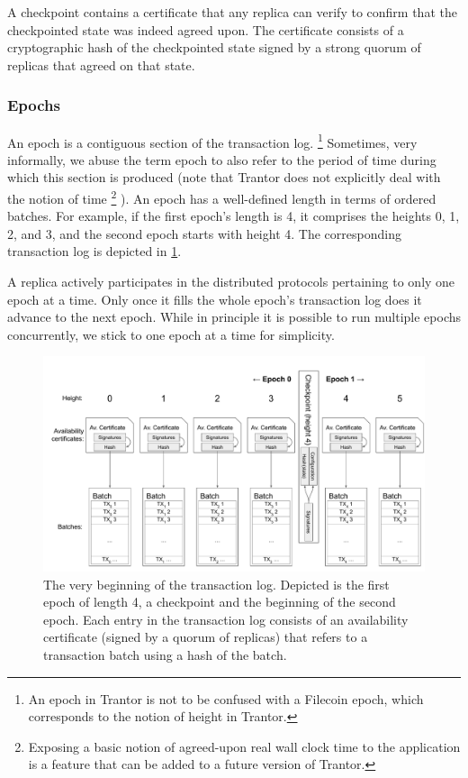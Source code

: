\documentclass{article}
\begin{document}
A checkpoint contains a certificate that any replica can verify
to confirm that the checkpointed state was indeed agreed upon.
The certificate consists of a cryptographic hash of the checkpointed state
signed by a strong quorum of replicas that agreed on that state.

\subsubsection{Epochs}

An epoch is a contiguous section of the transaction log.%
\footnote{An epoch in Trantor is not to be confused with a Filecoin epoch,
which corresponds to the notion of height in Trantor.}
Sometimes, very informally, we abuse the term epoch to also refer to the period of time
during which this section is produced (note that Trantor does not explicitly deal with the notion of time%
\footnote{Exposing a basic notion of agreed-upon real wall clock time to the application
is a feature that can be added to a future version of Trantor.}
).
An epoch has a well-defined length in terms of ordered batches.
For example, if the first epoch’s length is 4, it comprises the heights 0, 1, 2, and 3,
and the second epoch starts with height 4.
The corresponding transaction log is depicted in \cref{fig:transaction-log}.

A replica actively participates in the distributed protocols pertaining to only one epoch at a time.
Only once it fills the whole epoch’s transaction log does it advance to the next epoch.
While in principle it is possible to run multiple epochs concurrently, we stick to one epoch at a time for simplicity.

\begin{figure}[h]
    \centering
    \includegraphics[width=\textwidth]{figures/transaction-log}
    \caption{The very beginning of the transaction log.
    Depicted is the first epoch of length 4, a checkpoint and the beginning of the second epoch.
    Each entry in the transaction log consists of an availability certificate (signed by a quorum of replicas)
    that refers to a transaction batch using a hash of the batch.}
    \label{fig:transaction-log}
\end{figure}
\end{document}
